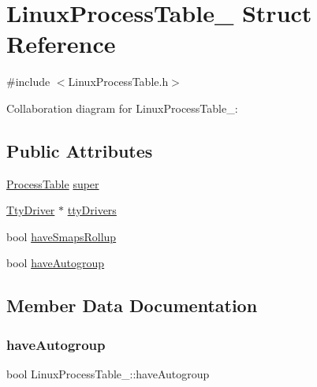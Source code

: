 \hypertarget{structLinuxProcessTable__}{}\section{Linux\+Process\+Table\+\_\+ Struct Reference}
\label{structLinuxProcessTable__}


{\ttfamily \#include $<$Linux\+Process\+Table.\+h$>$}



Collaboration diagram for Linux\+Process\+Table\+\_\+\+:
\subsection*{Public Attributes}
\begin{DoxyCompactItemize}
\item 
\hyperlink{ProcessTable_8h_a54ec62da6f9d80d4d06e3845a2597a80}{Process\+Table} \hyperlink{structLinuxProcessTable___a634b475fdbddf4fa961b42a225a0d21b}{super}
\item 
\hyperlink{LinuxProcessTable_8h_ae3b628cb53d0ffcc7fa8f057f5852817}{Tty\+Driver} $\ast$ \hyperlink{structLinuxProcessTable___a4703b7851332405c580e36782b817031}{tty\+Drivers}
\item 
bool \hyperlink{structLinuxProcessTable___ae50e45b3602a3f21632a6a306e72fc99}{have\+Smaps\+Rollup}
\item 
bool \hyperlink{structLinuxProcessTable___a995e8550b655bdf1874e84e6dc18f0cb}{have\+Autogroup}
\end{DoxyCompactItemize}


\subsection{Member Data Documentation}
\mbox{\label{structLinuxProcessTable___a995e8550b655bdf1874e84e6dc18f0cb}} 
\subsubsection{\texorpdfstring{have\+Autogroup}{haveAutogroup}}
{\footnotesize\ttfamily bool Linux\+Process\+Table\+\_\+\+::have\+Autogroup}

\mbox{\label{structLinuxProcessTable___ae50e45b3602a3f21632a6a306e72fc99}} 
